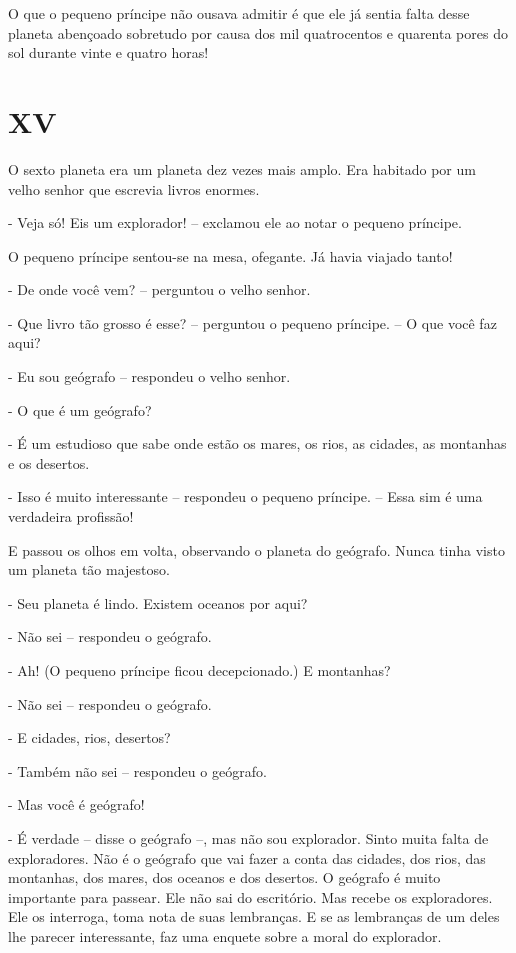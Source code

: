 O que o pequeno príncipe não ousava admitir é que ele já sentia falta
desse planeta abençoado sobretudo por causa dos mil quatrocentos e
quarenta pores do sol durante vinte e quatro horas!

\chapter{XV}

O sexto planeta era um planeta dez vezes mais amplo. Era habitado por um
velho senhor que escrevia livros enormes.

- Veja só! Eis um explorador! -- exclamou ele ao notar o pequeno
príncipe.

O pequeno príncipe sentou-se na mesa, ofegante. Já havia viajado tanto!

- De onde você vem? -- perguntou o velho senhor.

- Que livro tão grosso é esse? -- perguntou o pequeno príncipe. -- O que
você faz aqui?

- Eu sou geógrafo -- respondeu o velho senhor.

- O que é um geógrafo?

- É um estudioso que sabe onde estão os mares, os rios, as cidades, as
montanhas e os desertos.

- Isso é muito interessante -- respondeu o pequeno príncipe. -- Essa sim
é uma verdadeira profissão!

E passou os olhos em volta, observando o planeta do geógrafo. Nunca
tinha visto um planeta tão majestoso.

- Seu planeta é lindo. Existem oceanos por aqui?

- Não sei -- respondeu o geógrafo.

- Ah! (O pequeno príncipe ficou decepcionado.) E montanhas?

- Não sei -- respondeu o geógrafo.

- E cidades, rios, desertos?

- Também não sei -- respondeu o geógrafo.

- Mas você é geógrafo!

- É verdade -- disse o geógrafo --, mas não sou explorador. Sinto muita
falta de exploradores. Não é o geógrafo que vai fazer a conta das
cidades, dos rios, das montanhas, dos mares, dos oceanos e dos desertos.
O geógrafo é muito importante para passear. Ele não sai do escritório.
Mas recebe os exploradores. Ele os interroga, toma nota de suas
lembranças. E se as lembranças de um deles lhe parecer interessante, faz
uma enquete sobre a moral do explorador.

